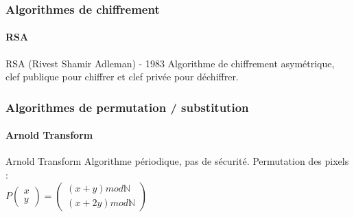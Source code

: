         \begin{frame}
            \frametitle{Algorithmes de chiffrement}
            \framesubtitle{RSA}
            \begin{block}{RSA (Rivest Shamir Adleman) - 1983}
                Algorithme de chiffrement asymétrique, clef publique pour chiffrer et clef privée pour déchiffrer.
            \end{block}
        \end{frame}

        \begin{frame}
            \frametitle{Algorithmes de permutation / substitution}
            \framesubtitle{Arnold Transform}
            \begin{block}{Arnold Transform}
                Algorithme périodique, pas de sécurité. Permutation des pixels :\\
                $P
                \begin{pmatrix}
                    x\\
                    y
                \end{pmatrix}
                =
                \begin{pmatrix}
                    (x + y) mod \mathbb{N}\\
                    (x + 2y) mod \mathbb{N}
                \end{pmatrix}$
            \end{block}
        \end{frame}

